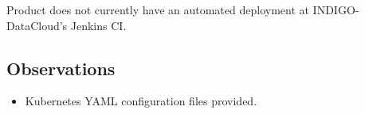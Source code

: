 \documentclass[a4wide,11pt]{article}
\begin{document}
Product does not currently have an automated deployment at INDIGO-DataCloud's Jenkins CI.

\subsection{Observations}
\begin{itemize}
        \item Kubernetes YAML configuration files provided.
    \end{itemize}


\newpage

\end{document}
